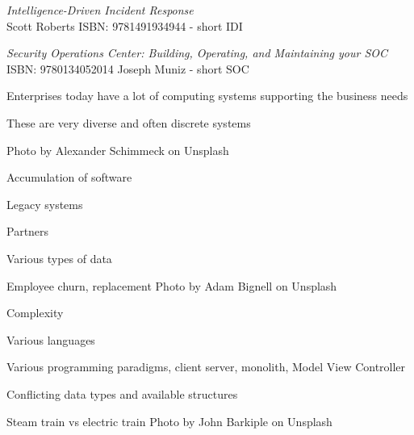 \documentclass[Screen16to9,17pt]{foils}
\begin{document}
\emph{Intelligence-Driven Incident Response} \\
 Scott Roberts ISBN: 9781491934944 - short IDI





\emph{Security Operations Center: Building, Operating, and Maintaining your SOC}\\
ISBN: 9780134052014 Joseph Muniz - short SOC







\begin{list2}
\item Enterprises today have a lot of computing systems supporting the business needs
\item These are very diverse and often discrete systems
\end{list2}

\hfill Photo by Alexander Schimmeck on Unsplash




\begin{list2}
\item Accumulation of software
\item Legacy systems
\item Partners
\item Various types of data
\item Employee churn, replacement \hfill Photo by Adam Bignell on Unsplash
\end{list2}





\begin{list2}
\item Complexity
\item Various languages
\item Various programming paradigms, client server, monolith, Model View Controller
\item Conflicting data types and available structures
\item Steam train vs electric train \hfill Photo by John Barkiple on Unsplash

\end{list2}
\end{document}

